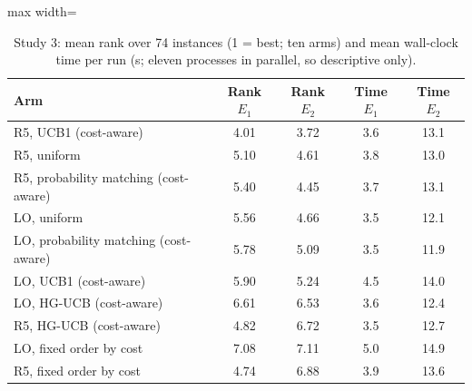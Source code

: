 \begin{table}[t]
\caption{Study 3: mean rank over 74 instances (1 = best; ten arms) and mean wall-clock time per run (s; eleven processes in parallel, so descriptive only).}\label{tab:ranks}
\centering
\small
\begin{adjustbox}{max width=\linewidth}
\begin{tabular}{lcccc}
\toprule
Arm & Rank $E_1$ & Rank $E_2$ & Time $E_1$ & Time $E_2$ \\
\midrule
R5, UCB1 (cost-aware) & 4.01 & 3.72 & 3.6 & 13.1 \\
R5, uniform & 5.10 & 4.61 & 3.8 & 13.0 \\
R5, probability matching (cost-aware) & 5.40 & 4.45 & 3.7 & 13.1 \\
LO, uniform & 5.56 & 4.66 & 3.5 & 12.1 \\
LO, probability matching (cost-aware) & 5.78 & 5.09 & 3.5 & 11.9 \\
LO, UCB1 (cost-aware) & 5.90 & 5.24 & 4.5 & 14.0 \\
LO, HG-UCB (cost-aware) & 6.61 & 6.53 & 3.6 & 12.4 \\
R5, HG-UCB (cost-aware) & 4.82 & 6.72 & 3.5 & 12.7 \\
LO, fixed order by cost & 7.08 & 7.11 & 5.0 & 14.9 \\
R5, fixed order by cost & 4.74 & 6.88 & 3.9 & 13.6 \\
\bottomrule
\end{tabular}
\end{adjustbox}
\end{table}
